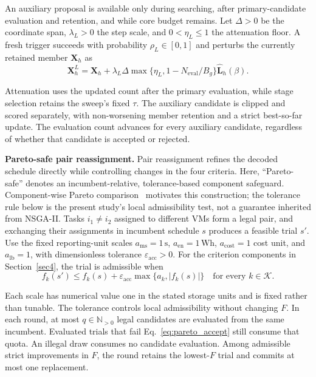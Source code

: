 \documentclass[pdflatex,onecolumn,sn-mathphys-num]{sn-jnl}
\begin{document}
An auxiliary proposal is available only during searching, after primary-candidate evaluation and retention, and while core budget remains. Let $\Delta>0$ be the coordinate span, $\lambda_L>0$ the step scale, and $0<\eta_L\leq1$ the attenuation floor. A fresh trigger succeeds with probability $\rho_L\in[0,1]$ and perturbs the currently retained member $\mathbf{X}_h$ as
\begin{equation}\label{eq:lscbo_levy}
\mathbf{X}_h^L=\mathbf{X}_h+\lambda_L\Delta
\max\{\eta_L,1-N_{\mathrm{eval}}/B_g\}\widehat{\mathbf{L}}_h(\beta).
\end{equation}

Attenuation uses the updated count after the primary evaluation, while stage selection retains the sweep's fixed $\tau$. The auxiliary candidate is clipped and scored separately, with non-worsening member retention and a strict best-so-far update. The evaluation count advances for every auxiliary candidate, regardless of whether that candidate is accepted or rejected.

\medskip
\textbf{Pareto-safe pair reassignment.}\label{sec:local_search}
Pair reassignment refines the decoded schedule directly while controlling changes in the four criteria. Here, ``Pareto-safe'' denotes an incumbent-relative, tolerance-based component safeguard. Component-wise Pareto comparison~\cite{Deb2002} motivates this construction; the tolerance rule below is the present study's local admissibility test, not a guarantee inherited from NSGA-II. Tasks $i_1\neq i_2$ assigned to different VMs form a legal pair, and exchanging their assignments in incumbent schedule $s$ produces a feasible trial $s'$. Use the fixed reporting-unit scales $a_{\mathrm{ms}}=1\,\mathrm{s}$, $a_{\mathrm{en}}=1\,\mathrm{Wh}$, $a_{\mathrm{cost}}=1$ cost unit, and $a_{\mathrm{lb}}=1$, with dimensionless tolerance $\varepsilon_{\mathrm{acc}}>0$. For the criterion components in Section~\ref{sec4}, the trial is admissible when
\begin{equation}\label{eq:pareto_accept}
f_k(s')\leq f_k(s)+\varepsilon_{\mathrm{acc}}\max\{a_k,|f_k(s)|\}
\quad\text{for every }k\in\mathcal{K}.
\end{equation}

Each scale has numerical value one in the stated storage units and is fixed rather than tunable. The tolerance controls local admissibility without changing $F$. In each round, at most $q\in\mathbb{N}_{>0}$ legal candidates are evaluated from the same incumbent. Evaluated trials that fail Eq.~\eqref{eq:pareto_accept} still consume that quota. An illegal draw consumes no candidate evaluation. Among admissible strict improvements in $F$, the round retains the lowest-$F$ trial and commits at most one replacement.
\end{document}
